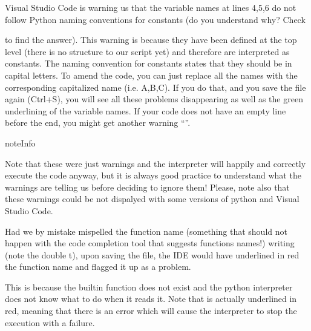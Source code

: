\documentclass[letterpaper,10pt,english]{sphinxmanual}
\let\sphinxpxdimen\pdfpxdimen\else\newdimen\sphinxpxdimen
\begin{document}
\sphinxAtStartPar
Visual Studio Code is warning us that the variable names  at lines 4,5,6 do not follow Python naming conventions for constants (do you understand why? Check %
\begin{footnote}[6]\sphinxAtStartFootnote
{}
%
\end{footnote} to find the answer). This warning is because they have been defined at the top level (there is no structure to our script yet) and therefore are interpreted as constants. The naming convention for constants states that they should be in capital letters. To amend the code,
you can just replace all the names with the corresponding capitalized name (i.e. A,B,C). If you do that, and you save the file again (Ctrl+S), you will see all these problems disappearing as well as the green underlining of the variable names. If your code does not have an empty line before the end, you might get another warning “”.

\begin{sphinxadmonition}{note}{Info}\par
\sphinxAtStartPar
Note that these were just warnings and the interpreter  will happily and correctly execute the code anyway, but it is always good practice to understand what the warnings are telling us before deciding to ignore them! Please, note also that these warnings could be not dispalyed with some versions of python and Visual Studio Code.
\end{sphinxadmonition}

\sphinxAtStartPar
Had we by mistake mispelled the  function name (something that should not happen with the code completion tool that suggests functions names!) writing  (note the double t), upon saving the file, the IDE would have underlined in red the function name and flagged it up as a problem.

\noindent\sphinxincludegraphics[width=433\sphinxpxdimen,height=355\sphinxpxdimen]{{errors}.png}

\sphinxAtStartPar
This is because the builtin function  does not exist and the python interpreter does not know what to do when it reads it. Note that  is actually underlined in red, meaning that there is an error which will cause the interpreter to stop the execution with a failure. 
\end{document}
